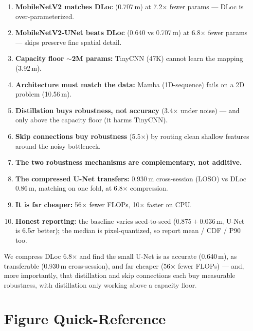 \documentclass[11pt]{article}
\begin{document}
\begin{enumerate}[leftmargin=*]
  \item \textbf{MobileNetV2 matches DLoc} (0.707\,m) at 7.2$\times$ fewer params --- DLoc is
        over-parameterized.
  \item \textbf{MobileNetV2-UNet beats DLoc} (0.640 vs 0.707\,m) at 6.8$\times$ fewer params --- skips
        preserve fine spatial detail.
  \item \textbf{Capacity floor $\sim$2M params:} TinyCNN (47K) cannot learn the mapping (3.92\,m).
  \item \textbf{Architecture must match the data:} Mamba (1D-sequence) fails on a 2D problem (10.56\,m).
  \item \textbf{Distillation buys robustness, not accuracy} (3.4$\times$ under noise) --- and only above
        the capacity floor (it harms TinyCNN).
  \item \textbf{Skip connections buy robustness} (5.5$\times$) by routing clean shallow features around
        the noisy bottleneck.
  \item \textbf{The two robustness mechanisms are complementary, not additive.}
  \item \textbf{The compressed U-Net transfers:} 0.930\,m cross-session (LOSO) vs DLoc 0.86\,m, matching
        on one fold, at 6.8$\times$ compression.
  \item \textbf{It is far cheaper:} 56$\times$ fewer FLOPs, 10$\times$ faster on CPU.
  \item \textbf{Honest reporting:} the baseline varies seed-to-seed ($0.875\pm0.036$\,m, U-Net is
        6.5$\sigma$ better); the median is pixel-quantized, so report mean / CDF / P90 too.
\end{enumerate}

\begin{keybox}
We compress DLoc 6.8$\times$ and find the small U-Net is as accurate (0.640\,m), as transferable
(0.930\,m cross-session), and far cheaper (56$\times$ fewer FLOPs) --- and, more importantly, that
distillation and skip connections each buy measurable robustness, with distillation only working above a
capacity floor.
\end{keybox}

\section{Figure Quick-Reference}
\end{document}
